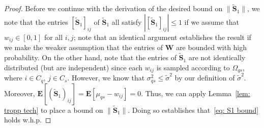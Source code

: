 \documentclass[twoside,11pt]{article}
\renewcommand{\S}{\mathbf{S}}
\newcommand{\E}{\mathbf{E}}
\newcommand{\St}{\bs{\tilde S}}
\newcommand{\bs}{\boldsymbol}
\newcommand{\W}{\bs {W}}
\newcommand{\0}{\bs{0}}
\newcommand{\sbra}[1] {\ensuremath{ \left[ #1\right]}} %
\newcommand{\bra}[1]{\ensuremath{\left\{ #1 \right\}}} %
\begin{document}
\begin{proof}
Before we continue with the derivation of the desired bound on \(\|\St_1\|\), we note that
the entries $[\St_1]_{ij}$ of $\St_1$ all satisfy $|[\St_1]_{ij}| \leq 1$ if we assume that \(w_{ij} \in [0,1]\)
for all \(i,j\); note that an identical argument establishes the result if we make the weaker assumption that
the entries of \(\W\) are bounded with high probability.
On the other hand, note that the
entries of $\St_1$ are not identically distributed (but are independent) since each $w_{ij}$ is sampled according to $\Omega_{qs}$, where $i \in C_q$, $j\in C_s$. However, we know that $\sigma^2_{qs} \le \tilde\sigma^2$ by our definition of $\tilde\sigma^2$. Moreover, $\E[{(\St_1)}_{ij}] = \E[\mu_{qs} - w_{ij}] = 0$.
Thus, we can apply Lemma~\ref{lem: tropp tech} to place a bound on $\|\St_1\|$.
Doing so establishes that~\eqref{eq: S1 bound} holds w.h.p.
%

\end{proof}
\end{document}
